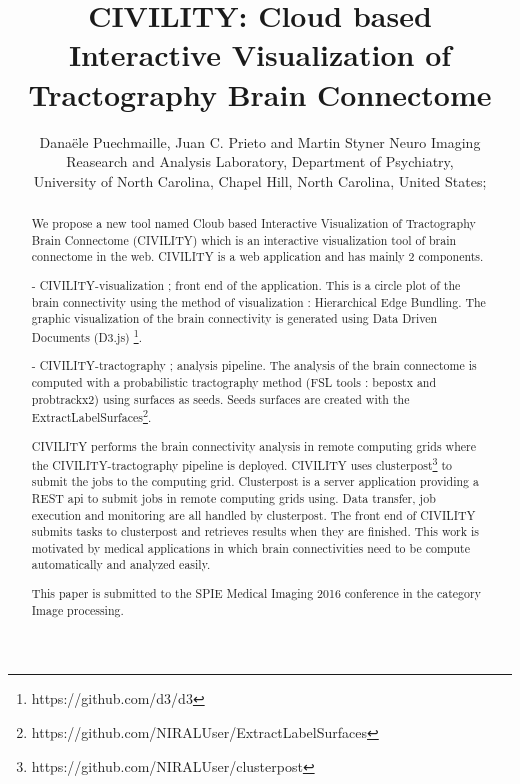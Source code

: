 \documentclass[]{spie}  %
\title{CIVILITY: Cloud based Interactive Visualization of Tractography Brain Connectome}
\author{Dana\"{e}le Puechmaille\supit{a}, Juan C. Prieto\supit{a} and Martin Styner\supit{a}
\skiplinehalf
\supit{a}Neuro Imaging Reasearch and Analysis Laboratory, Department of Psychiatry, \\
 University of North Carolina, Chapel Hill, North Carolina, United States;
}
\begin{document}
 
  \maketitle 

\begin{abstract}

We propose a new tool named Cloub based Interactive Visualization of Tractography Brain Connectome (CIVILITY) which is an interactive visualization tool of brain connectome in the web.
CIVILITY is a web application and has mainly 2 components.

- CIVILITY-visualization ; front end of the application. This is a circle plot of the brain connectivity using the method of visualization : Hierarchical Edge Bundling. The graphic visualization of the brain connectivity is generated using Data Driven Documents (D3.js) \footnote{https://github.com/d3/d3}.

- CIVILITY-tractography ; analysis pipeline. The analysis of the brain connectome is computed with a probabilistic tractography method (FSL tools : bepostx and probtrackx2) using surfaces as seeds. Seeds surfaces are created with the ExtractLabelSurfaces\footnote{https://github.com/NIRALUser/ExtractLabelSurfaces}.

CIVILITY performs the brain connectivity analysis in remote computing grids where the CIVILITY-tractography pipeline is deployed. CIVILITY uses clusterpost\footnote{https://github.com/NIRALUser/clusterpost} to submit the jobs to the computing grid. Clusterpost is a server application providing a REST api to submit jobs in remote computing grids using. Data transfer, job execution and monitoring are all handled by clusterpost.
The front end of CIVILITY submits tasks to clusterpost and retrieves results when they are finished.
This work is motivated by medical applications in which brain connectivities need to be compute automatically and analyzed easily.

This paper is submitted to the SPIE Medical Imaging 2016 conference in the category Image processing. 

\end{abstract}



\end{document}
